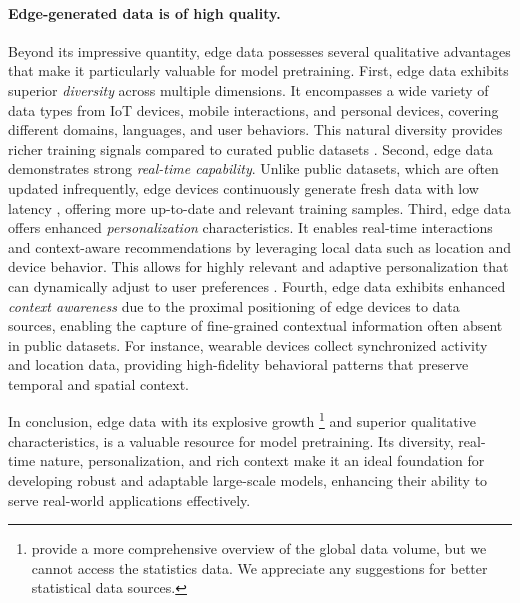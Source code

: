 \paragraph{Edge-generated data is of high quality.} 
Beyond its impressive quantity, edge data possesses several qualitative advantages that make it particularly valuable for model pretraining.
First, edge data exhibits superior \textit{diversity} across multiple dimensions. It encompasses a wide variety of data types from IoT devices, mobile interactions, and personal devices, covering different domains, languages, and user behaviors. This natural diversity provides richer training signals compared to curated public datasets \cite{nayak2024review}. 
Second, edge data demonstrates strong \textit{real-time capability}. Unlike public datasets, which are often updated infrequently, edge devices continuously generate fresh data with low latency \cite{cavliwireless_edgecomputing}, offering more up-to-date and relevant training samples.
Third, edge data offers enhanced \textit{personalization} characteristics. It enables real-time interactions and context-aware recommendations by leveraging local data such as location and device behavior. This allows for highly relevant and adaptive personalization that can dynamically adjust to user preferences \cite{xenonstack_edge_ai_2023}.
Fourth, edge data exhibits enhanced \textit{context awareness} due to the proximal positioning of edge devices to data sources, enabling the capture of fine-grained contextual information often absent in public datasets. For instance, wearable devices collect synchronized activity and location data, providing high-fidelity behavioral patterns that preserve temporal and spatial context.

\vspace{-0.1cm}
In conclusion, edge data with its explosive growth
\footnote{
\citet{idc_seagate_dataage_2019,seagate_rethinkdata_2020} provide a more comprehensive overview of the global data volume, but we cannot access the statistics data. 
We appreciate any suggestions for better statistical data sources.
}
and superior qualitative characteristics, is a valuable resource for model pretraining. Its diversity, real-time nature, personalization, and rich context make it an ideal foundation for developing robust and adaptable large-scale models, enhancing their ability to serve real-world applications effectively.





